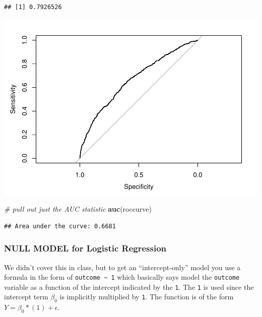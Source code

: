 \documentclass[]{article}
\newenvironment{Shaded}{\begin{snugshade}}{\end{snugshade}}
\newcommand{\KeywordTok}[1]{\textcolor[rgb]{0.13,0.29,0.53}{\textbf{{#1}}}}
\newcommand{\StringTok}[1]{\textcolor[rgb]{0.31,0.60,0.02}{{#1}}}
\newcommand{\CommentTok}[1]{\textcolor[rgb]{0.56,0.35,0.01}{\textit{{#1}}}}
\newcommand{\NormalTok}[1]{{#1}}
\begin{document}
\begin{verbatim}
## [1] 0.7926526
\end{verbatim}

\begin{Shaded}
\end{Shaded}

\includegraphics{Hmwk7AnswerKey_files/figure-latex/unnamed-chunk-7-2.pdf}

\begin{Shaded}
\begin{Highlighting}[]
\CommentTok{# pull out just the AUC statistic}
\KeywordTok{auc}\NormalTok{(roccurve)}
\end{Highlighting}
\end{Shaded}

\begin{verbatim}
## Area under the curve: 0.6681
\end{verbatim}

\subsubsection{NULL MODEL for Logistic
Regression}\label{null-model-for-logistic-regression}

We didn't cover this in class, but to get an ``intercept-only'' model
you use a formula in the form of \texttt{outcome\ \textasciitilde{}\ 1}
which basically says model the \texttt{outcome} variable as a function
of the intercept indicated by the \texttt{1}. The \texttt{1} is used
since the intercept term \(\beta_0\) is implicitly multiplied by
\texttt{1}. The function is of the form \(Y = \beta_0*(1) + \epsilon\).
\end{document}
